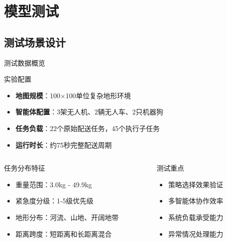 \documentclass[
10pt,
aspectratio=169,
]{beamer}
\begin{document}

\section{模型测试}

\subsection{测试场景设计}

\begin{frame}{测试数据概览}
    \begin{block}{实验配置}
        \begin{itemize}
            \item \textbf{地图规模}：100×100单位复杂地形环境
            \item \textbf{智能体配置}：3架无人机、2辆无人车、2只机器狗
            \item \textbf{任务负载}：22个原始配送任务，45个执行子任务
            \item \textbf{运行时长}：约75秒完整配送周期
        \end{itemize}
    \end{block}
    
    \begin{columns}
        \begin{column}{0.5\textwidth}
            \begin{exampleblock}{任务分布特征}
                \begin{itemize}
                    \item 重量范围：3.0kg - 49.9kg
                    \item 紧急度分级：1-5级优先级
                    \item 地形分布：河流、山地、开阔地带
                    \item 距离跨度：短距离和长距离混合
                \end{itemize}
            \end{exampleblock}
        \end{column}
        \begin{column}{0.5\textwidth}
            \begin{alertblock}{测试重点}
                \begin{itemize}
                    \item 策略选择效果验证
                    \item 多智能体协作效率
                    \item 系统负载承受能力
                    \item 异常情况处理能力
                \end{itemize}
            \end{alertblock}
        \end{column}
    \end{columns}
\end{frame}
\end{document}
